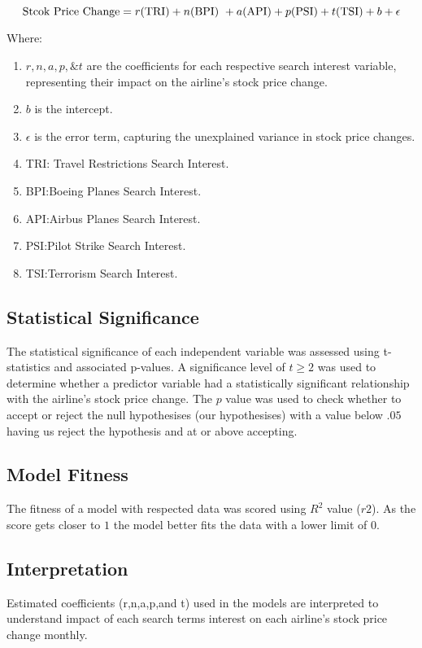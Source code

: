 \documentclass[12pt]{report}
\begin{document}
\[ \text{Stcok Price Change} =   r\text{(TRI)} + n\text{(BPI) }+\\ a\text{(API)} + p\text{(PSI)} + t\text{(TSI)} + b + \epsilon\]

Where:
\begin{enumerate}
    \item $r, n,a, p, \& t $ are the coefficients for each respective search interest variable, representing their impact on the airline's stock price change.
    \item $b$ is the intercept.
    \item $\epsilon$ is the error term, capturing the unexplained variance in stock price changes.
    \item TRI: Travel Restrictions Search Interest.
    \item BPI:Boeing Planes Search Interest.
    \item API:Airbus Planes Search Interest.
    \item PSI:Pilot Strike Search Interest.
    \item TSI:Terrorism Search Interest.

\end{enumerate}

\subsection*{Statistical Significance}


The statistical significance of each independent variable
was assessed using t-statistics and associated p-values. A significance level
of $t\geq 2$ was used to determine whether a predictor variable had a
statistically significant relationship with the airline's stock price change. The $p$ value was used to check whether to accept or reject the null hypothesises (our hypothesises) with a value below $.05$ having us reject the hypothesis and at or above accepting.


\subsection*{Model Fitness}
The fitness of a model with respected data was scored using $R^2$ value ($r2$). As the score gets closer to $1$ the model better fits the data with a lower limit of 0.
\subsection*{Interpretation}
Estimated coefficients (r,n,a,p,and t) used in the models are interpreted to understand impact of each search terms interest on each airline's stock price change monthly.
\end{document}
